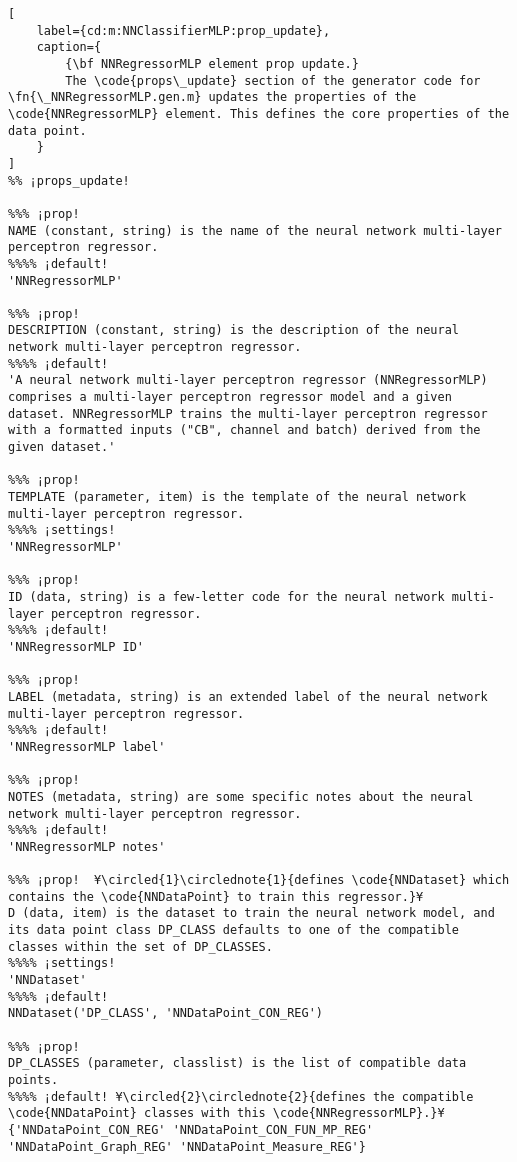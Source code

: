\documentclass{tufte-handout}
\begin{document}
\begin{lstlisting}[
	label={cd:m:NNClassifierMLP:prop_update},
	caption={
		{\bf NNRegressorMLP element prop update.}
		The \code{props\_update} section of the generator code for \fn{\_NNRegressorMLP.gen.m} updates the properties of the \code{NNRegressorMLP} element. This defines the core properties of the data point.
	}
]
%% ¡props_update!

%%% ¡prop!
NAME (constant, string) is the name of the neural network multi-layer perceptron regressor.
%%%% ¡default!
'NNRegressorMLP'

%%% ¡prop!
DESCRIPTION (constant, string) is the description of the neural network multi-layer perceptron regressor.
%%%% ¡default!
'A neural network multi-layer perceptron regressor (NNRegressorMLP) comprises a multi-layer perceptron regressor model and a given dataset. NNRegressorMLP trains the multi-layer perceptron regressor with a formatted inputs ("CB", channel and batch) derived from the given dataset.'

%%% ¡prop!
TEMPLATE (parameter, item) is the template of the neural network multi-layer perceptron regressor.
%%%% ¡settings!
'NNRegressorMLP'

%%% ¡prop!
ID (data, string) is a few-letter code for the neural network multi-layer perceptron regressor.
%%%% ¡default!
'NNRegressorMLP ID'

%%% ¡prop!
LABEL (metadata, string) is an extended label of the neural network multi-layer perceptron regressor.
%%%% ¡default!
'NNRegressorMLP label'

%%% ¡prop!
NOTES (metadata, string) are some specific notes about the neural network multi-layer perceptron regressor.
%%%% ¡default!
'NNRegressorMLP notes'

%%% ¡prop!  ¥\circled{1}\circlednote{1}{defines \code{NNDataset} which contains the \code{NNDataPoint} to train this regressor.}¥
D (data, item) is the dataset to train the neural network model, and its data point class DP_CLASS defaults to one of the compatible classes within the set of DP_CLASSES.
%%%% ¡settings!
'NNDataset'
%%%% ¡default!
NNDataset('DP_CLASS', 'NNDataPoint_CON_REG')

%%% ¡prop!
DP_CLASSES (parameter, classlist) is the list of compatible data points.
%%%% ¡default! ¥\circled{2}\circlednote{2}{defines the compatible \code{NNDataPoint} classes with this \code{NNRegressorMLP}.}¥
{'NNDataPoint_CON_REG' 'NNDataPoint_CON_FUN_MP_REG' 'NNDataPoint_Graph_REG' 'NNDataPoint_Measure_REG'}


\end{lstlisting}
\end{document}
